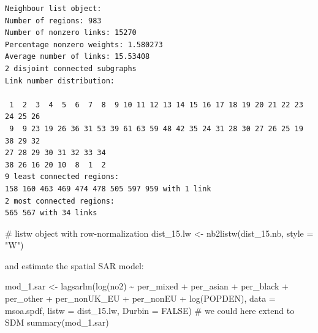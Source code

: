 \documentclass[
  letterpaper,
]{scrbook}
\newenvironment{Shaded}{\begin{snugshade}}{\end{snugshade}}
\newcommand{\AttributeTok}[1]{\textcolor[rgb]{0.40,0.45,0.13}{#1}}
\newcommand{\CommentTok}[1]{\textcolor[rgb]{0.37,0.37,0.37}{#1}}
\newcommand{\ConstantTok}[1]{\textcolor[rgb]{0.56,0.35,0.01}{#1}}
\newcommand{\DecValTok}[1]{\textcolor[rgb]{0.68,0.00,0.00}{#1}}
\newcommand{\FunctionTok}[1]{\textcolor[rgb]{0.28,0.35,0.67}{#1}}
\newcommand{\NormalTok}[1]{\textcolor[rgb]{0.00,0.23,0.31}{#1}}
\newcommand{\OtherTok}[1]{\textcolor[rgb]{0.00,0.23,0.31}{#1}}
\newcommand{\SpecialCharTok}[1]{\textcolor[rgb]{0.37,0.37,0.37}{#1}}
\newcommand{\StringTok}[1]{\textcolor[rgb]{0.13,0.47,0.30}{#1}}
\begin{document}
\begin{Shaded}
\end{Shaded}

\begin{verbatim}
Neighbour list object:
Number of regions: 983 
Number of nonzero links: 15270 
Percentage nonzero weights: 1.580273 
Average number of links: 15.53408 
2 disjoint connected subgraphs
Link number distribution:

 1  2  3  4  5  6  7  8  9 10 11 12 13 14 15 16 17 18 19 20 21 22 23 24 25 26 
 9  9 23 19 26 36 31 53 39 61 63 59 48 42 35 24 31 28 30 27 26 25 19 38 29 32 
27 28 29 30 31 32 33 34 
38 26 16 20 10  8  1  2 
9 least connected regions:
158 160 463 469 474 478 505 597 959 with 1 link
2 most connected regions:
565 567 with 34 links
\end{verbatim}

\begin{Shaded}
\begin{Highlighting}[]
\CommentTok{\# listw object with row{-}normalization}
\NormalTok{dist\_15.lw }\OtherTok{\textless{}{-}} \FunctionTok{nb2listw}\NormalTok{(dist\_15.nb, }\AttributeTok{style =} \StringTok{"W"}\NormalTok{)}
\end{Highlighting}
\end{Shaded}

and estimate the spatial SAR model:

\begin{Shaded}
\begin{Highlighting}[]
\NormalTok{mod\_1.sar }\OtherTok{\textless{}{-}} \FunctionTok{lagsarlm}\NormalTok{(}\FunctionTok{log}\NormalTok{(no2) }\SpecialCharTok{\textasciitilde{}}\NormalTok{ per\_mixed }\SpecialCharTok{+}\NormalTok{ per\_asian }\SpecialCharTok{+}\NormalTok{ per\_black }\SpecialCharTok{+}\NormalTok{ per\_other}
                      \SpecialCharTok{+}\NormalTok{ per\_nonUK\_EU }\SpecialCharTok{+}\NormalTok{ per\_nonEU  }\SpecialCharTok{+} \FunctionTok{log}\NormalTok{(POPDEN),  }
                      \AttributeTok{data =}\NormalTok{ msoa.spdf, }
                      \AttributeTok{listw =}\NormalTok{ dist\_15.lw,}
                      \AttributeTok{Durbin =} \ConstantTok{FALSE}\NormalTok{) }\CommentTok{\# we could here extend to SDM}
\FunctionTok{summary}\NormalTok{(mod\_1.sar)}
\end{Highlighting}
\end{Shaded}
\end{document}
